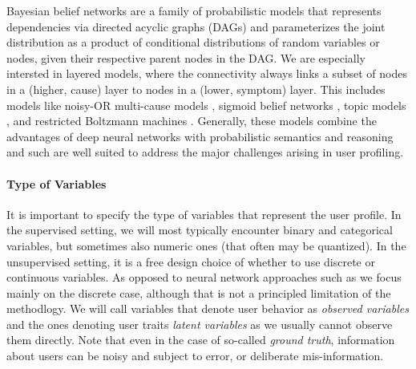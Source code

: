 \documentclass{article}
\begin{document}
Bayesian belief networks \cite{pearl2014probabilistic} are a family of probabilistic models that represents dependencies via directed acyclic graphs (DAGs) and parameterizes the joint distribution as a product of conditional distributions of random variables or nodes, given their respective parent nodes in the DAG. We are especially intersted in layered models, where the connectivity always links a subset of nodes in a (higher, cause) layer to nodes in a (lower, symptom) layer. This includes models like noisy-OR multi-cause models  \cite{shwe1991probabilistic,jaakkola1999variational}, sigmoid belief networks \cite{saul1996mean}, topic models \cite{hofmann2001unsupervised,blei2003latent}, and restricted Boltzmann machines \cite{salakhutdinov2007restricted}. Generally, these models combine the advantages of deep neural networks with probabilistic semantics and reasoning and such are well suited to address the major challenges arising in user profiling. 

\paragraph{Type of Variables}

It is important to  specify the type of variables that represent the user profile. In the supervised setting, we will most typically encounter binary and categorical variables, but sometimes also numeric ones (that often may be quantized). In the unsupervised setting, it is a free design choice of whether to use discrete or continuous variables. As opposed to neural network approaches such as \cite{mikolov2013linguistic,bengio2003neural} we focus mainly on the discrete case, although that is not a principled limitation of the methodlogy. We will call variables that denote user behavior as \textit{observed variables} and the ones denoting user traits \textit{latent variables} as we usually cannot observe them directly. Note that even in the case of so-called \textit{ground truth}, information about users can be noisy and subject to error, or deliberate mis-information. 
\end{document}
